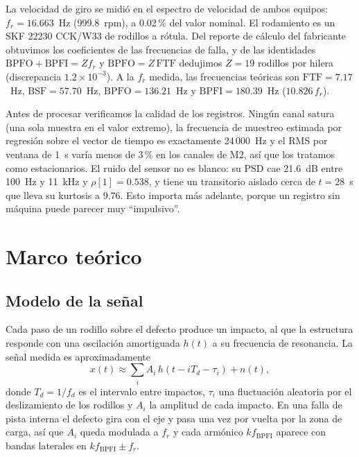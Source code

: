\documentclass[conference,a4paper]{IEEEtran}
\newcommand{\fbpfi}{f_{\mathrm{BPFI}}}
\begin{document}
La velocidad de giro se midió en el espectro de velocidad de ambos equipos: $f_r=16.663$~Hz (999.8~rpm), a 0.02\,\% del valor nominal. El rodamiento es un SKF 22230 CCK/W33 de rodillos a rótula. Del reporte de cálculo del fabricante~\cite{skf} obtuvimos los coeficientes de las frecuencias de falla, y de las identidades $\mathrm{BPFO}+\mathrm{BPFI}=Z f_r$ y $\mathrm{BPFO}=Z\,\mathrm{FTF}$ dedujimos $Z=19$ rodillos por hilera (discrepancia $1.2\times10^{-3}$). A la $f_r$ medida, las frecuencias teóricas son $\mathrm{FTF}=7.17$~Hz, $\mathrm{BSF}=57.70$~Hz, $\mathrm{BPFO}=136.21$~Hz y $\mathrm{BPFI}=180.39$~Hz ($10.826\,f_r$).

Antes de procesar verificamos la calidad de los registros. Ningún canal satura (una sola muestra en el valor extremo), la frecuencia de muestreo estimada por regresión sobre el vector de tiempo es exactamente 24\,000~Hz y el RMS por ventana de 1~s varía menos de 3\,\% en los canales de M2, así que los tratamos como estacionarios. El ruido del sensor no es blanco: su PSD cae 21.6~dB entre 100~Hz y 11~kHz y $\rho[1]=0.538$, y tiene un transitorio aislado cerca de $t=28$~s que lleva su kurtosis a 9.76. Esto importa más adelante, porque un registro sin máquina puede parecer muy ``impulsivo''.

\section{Marco teórico}

\subsection{Modelo de la señal}
Cada paso de un rodillo sobre el defecto produce un impacto, al que la estructura responde con una oscilación amortiguada $h(t)$ a su frecuencia de resonancia. La señal medida es aproximadamente~\cite{randall2011tutorial}
\begin{equation}
x(t)\approx\sum_i A_i\,h\!\left(t-iT_d-\tau_i\right)+n(t),
\label{eq:modelo}
\end{equation}
donde $T_d=1/f_d$ es el intervalo entre impactos, $\tau_i$ una fluctuación aleatoria por el deslizamiento de los rodillos y $A_i$ la amplitud de cada impacto. En una falla de pista interna el defecto gira con el eje y pasa una vez por vuelta por la zona de carga, así que $A_i$ queda modulada a $f_r$ y cada armónico $k\fbpfi$ aparece con bandas laterales en $k\fbpfi\pm f_r$.
\end{document}
